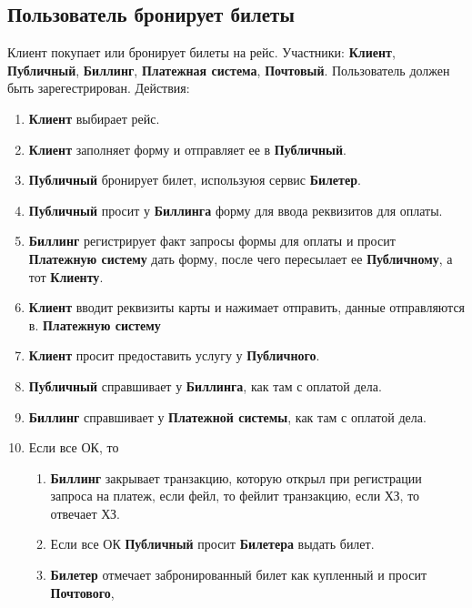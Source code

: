\subsection{Пользователь бронирует билеты}
Клиент покупает или бронирует билеты на рейс. Участники:
\textbf{Клиент}, \textbf{Публичный}, \textbf{Биллинг},
\textbf{Платежная система}, \textbf{Почтовый}. Пользователь
должен быть зарегестрирован. Действия:
\begin{enumerate}
      \item \textbf{Клиент} выбирает рейс.
      \item \textbf{Клиент} заполняет форму и отправляет ее
            в \textbf{Публичный}.
      \item \textbf{Публичный} бронирует билет, используюя
            сервис \textbf{Билетер}.
      \item \textbf{Публичный} просит у \textbf{Биллинга}
            форму для ввода реквизитов для оплаты.
      \item \textbf{Биллинг} регистрирует факт запросы формы
            для оплаты и просит \textbf{Платежную систему}
            дать форму, после чего пересылает ее
            \textbf{Публичному}, а тот \textbf{Клиенту}.
      \item \textbf{Клиент} вводит реквизиты карты и нажимает
            отправить, данные отправляются в.
            \textbf{Платежную систему}
      \item \textbf{Клиент} просит предоставить услугу у
            \textbf{Публичного}.
      \item \textbf{Публичный} справшивает у \textbf{Биллинга},
            как там с оплатой дела.
      \item \textbf{Биллинг} справшивает у \textbf{Платежной системы},
            как там с оплатой дела.
      \item Если все ОК, то
            \begin{enumerate}
                  \item \textbf{Биллинг} закрывает транзакцию, которую
                        открыл при регистрации запроса на платеж,
                        если фейл, то фейлит транзакцию, если ХЗ,
                        то отвечает ХЗ.
                  \item Если все ОК \textbf{Публичный} просит
                        \textbf{Билетера} выдать билет.
                  \item \textbf{Билетер} отмечает забронированный
                        билет как купленный и просит \textbf{Почтового},

\end{enumerate}
\end{enumerate}
